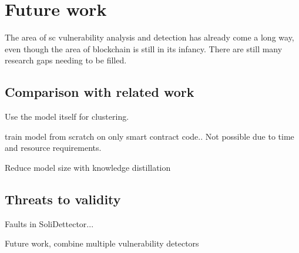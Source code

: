\chapter{Future work}
\label{chap:future-work}

The area of \acrshort{sc} vulnerability analysis and detection has already come a long way, even though the area of blockchain is still in its infancy. There are still many research gaps needing to be filled.

\section{Comparison with related work}
\label{sec:comparison-with-related-work}


Use the model itself for clustering.

train model from scratch on only smart contract code.. Not possible  due to time and resource requirements.


Reduce model size with knowledge distillation

\section{Threats to validity}
\label{sec:threats-to-validity}

Faults in SoliDettector...

Future work, combine multiple vulnerability detectors